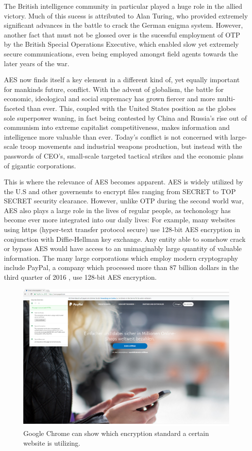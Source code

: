 \documentclass[12pt]{report}
\theoremstyle{definition}
\theoremstyle{remark}
\begin{document}
The British intelligence community in particular played a huge role in the allied victory. Much of this sucess is attributed to Alan Turing, who provided extremely significant advances in the battle to crack the German enigma system\cite{AlanTuring}. However, another fact that must not be glossed over is the sucessful employment of OTP by the British Special Operations Executive, which enabled slow yet extremely secure communications, even being employed amongst field agents towards the later years of the war.

AES now finds itself a key element in a different kind of, yet equally important for mankinds future, conflict. With the advent of globalism, the battle for economic, ideological and social supremacy has grown fiercer and more multi-faceted than ever. This, coupled with the United States position as the globes sole superpower waning, in fact being contested by China and Russia's rise out of communism into extreme capitalist competitiveness, makes information and intelligence more valuable than ever. Today's conflict is not concerned with large-scale troop movements and industrial weapons production, but instead with the passwords of CEO's, small-scale targeted tactical strikes and the economic plans of gigantic corporations.

This is where the relevance of AES becomes apparent. AES is widely utilized by the U.S and other governemts to encrypt files ranging from SECRET to TOP SECRET security clearance\cite{CNSSPolicy}. However, unlike OTP during the second world war, AES also plays a large role in the lives of regular people, as techonology has become ever more integrated into our daily lives: For example, many websites using https (hyper-text transfer protocol secure) use 128-bit AES encryption in conjunction with Diffie-Hellman key exchange. Any entity able to somehow crack or bypass AES would have access to an unimaginably large quantity of valuable information. The many large corporations which employ modern cryptography include PayPal, a company which processed more than 87 billion dollars in the third quarter of 2016 \cite{PayPal}, use 128-bit AES encryption.

\begin{figure}[H]
\centering
\includegraphics[scale=0.3]{PayPal.png}
\caption{Google Chrome can show which encryption standard a certain website is utilizing.}
\end{figure}
\end{document}
